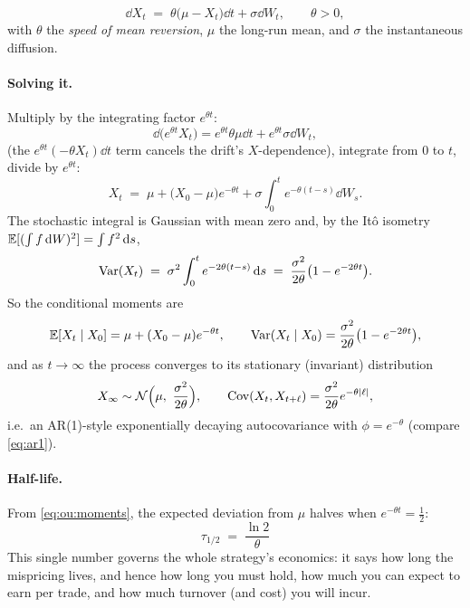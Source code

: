 \begin{definition}
\begin{equation}
  \dd X_t \;=\; \theta\bigl(\mu - X_t\bigr)\dd t + \sigma\dd W_t,
  \qquad \theta>0,
  \label{eq:ou}
\end{equation}
with $\theta$ the \emph{speed of mean reversion}, $\mu$ the long-run mean, and $\sigma$
the instantaneous diffusion.
\end{definition}

\paragraph{Solving it.} Multiply by the integrating factor $e^{\theta t}$:
\[
  \dd\bigl(e^{\theta t}X_t\bigr) = e^{\theta t}\theta\mu\dd t + e^{\theta t}\sigma\dd W_t ,
\]
(the $e^{\theta t}(-\theta X_t)\dd t$ term cancels the drift's $X$-dependence), integrate
from $0$ to $t$, divide by $e^{\theta t}$:
\begin{equation}
  X_t \;=\; \mu + \bigl(X_0-\mu\bigr)e^{-\theta t} + \sigma\int_0^t e^{-\theta(t-s)}\dd W_s .
  \label{eq:ou:solution}
\end{equation}
The stochastic integral is Gaussian with mean zero and, by the Itô isometry
$\mathbb{E}[(\int f\,\mathrm{d} W)^2]=\int f^2\,\mathrm{d} s$,
\begin{equation}
  \operatorname{Var}(X_t) \;=\; \sigma^2\int_0^t e^{-2\theta(t-s)}\,\mathrm{d} s
  \;=\; \frac{\sigma^2}{2\theta}\bigl(1-e^{-2\theta t}\bigr).
  \label{eq:ou:variance}
\end{equation}
So the conditional moments are
\begin{equation}
  \mathbb{E}[X_t\mid X_0] = \mu + (X_0-\mu)e^{-\theta t},
  \qquad
  \operatorname{Var}(X_t\mid X_0) = \frac{\sigma^2}{2\theta}\bigl(1-e^{-2\theta t}\bigr),
  \label{eq:ou:moments}
\end{equation}
and as $t\to\infty$ the process converges to its stationary (invariant) distribution
\begin{equation}
  X_\infty \sim \mathcal N\Bigl(\mu,\ \frac{\sigma^2}{2\theta}\Bigr),
  \qquad
  \Cov(X_t, X_{t+\ell}) = \frac{\sigma^2}{2\theta}e^{-\theta\lvert\ell\rvert},
  \label{eq:ou:stationary}
\end{equation}
i.e.\ an AR(1)-style exponentially decaying autocovariance with $\phi=e^{-\theta}$
(compare \eqref{eq:ar1}).

\paragraph{Half-life.} From \eqref{eq:ou:moments}, the expected deviation from $\mu$
halves when $e^{-\theta t}=\tfrac12$:
\begin{equation}
  \boxed{\ \tau_{1/2} \;=\; \frac{\ln 2}{\theta}\ }
  \label{eq:halflife}
\end{equation}
This single number governs the whole strategy's economics: it says how long the
mispricing lives, and hence how long you must hold, how much you can expect to earn per
trade, and how much turnover (and cost) you will incur.

